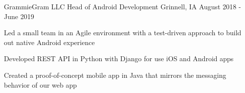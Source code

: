 \documentclass[11pt, a4paper]{awesome-cv}
\begin{document}
\begin{cventries}


  \cventry
    {GrammieGram LLC}
    {Head of Android Development}
    {Grinnell, IA}
    {August 2018 - June 2019}
    {
      \begin{cvitems}
        \item {Led a small team in an Agile environment with a test-driven approach to build out native Android experience}
      	\item {Developed REST API in Python with Django for use iOS and Android apps}
	      \item {Created a proof-of-concept mobile app in Java that mirrors the messaging behavior of our web app}
      \end{cvitems}
    }



\end{cventries}
\end{document}

